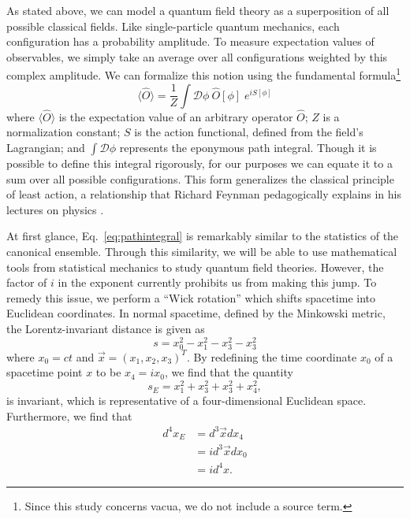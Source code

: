 \documentclass[12pt]{report}
\begin{document}
As stated above, we can model a quantum field theory as a superposition of all possible classical fields. Like single-particle quantum mechanics, each configuration has a probability amplitude. To measure expectation values of observables, we simply take an average over all configurations weighted by this complex amplitude. We can formalize this notion using the fundamental formula\footnote{Since this study concerns vacua, we do not include a source term.}
\begin{equation}
    \label{eq:pathintegral}
    \langle \hat O \rangle = \frac{1}{Z} \int \mathcal{D}\phi \: \hat O [\phi]\; e^{iS[\phi]}
\end{equation}
where $\langle \hat O \rangle$ is the expectation value of an arbitrary operator $\hat O$; $Z$ is a normalization constant; $S$ is the action functional, defined from the field's Lagrangian; and $\int \mathcal{D}\phi$ represents the eponymous path integral. Though it is possible to define this integral rigorously, for our purposes we can equate it to a sum over all possible configurations. This form generalizes the classical principle of least action, a relationship that Richard Feynman pedagogically explains in his lectures on physics \cite{feynman1963a}. 

At first glance, Eq.~\ref{eq:pathintegral} is remarkably similar to the statistics of the canonical ensemble. Through this similarity, we will be able to use mathematical tools from statistical mechanics to study quantum field theories. However, the factor of $i$ in the exponent currently prohibits us from making this jump. To remedy this issue, we perform a ``Wick rotation'' which shifts spacetime into Euclidean coordinates. In normal spacetime, defined by the Minkowski metric, the Lorentz-invariant distance is given as
\begin{equation}
    s = x^2_0 - x^2_1- x^2_3- x^2_3
\end{equation}
where $x_0=ct$ and $\vec{x} = (x_1, x_2, x_3)^T$. By redefining the time coordinate $x_0$ of a spacetime point $x$ to be $x_4=ix_0$, we find that the quantity
\begin{equation}
    s_E = x^2_1+ x^2_3+ x^2_3 + x^2_4,
\end{equation}
is invariant, which is representative of a four-dimensional Euclidean space. Furthermore, we find that
\begin{align}
    d^4x_E &= d^3\vec{x}dx_4 \\
    &= i d^3\vec{x}dx_0 \\
    &= i d^4x. \label{eq:wickdifferential}
\end{align}
\end{document}
